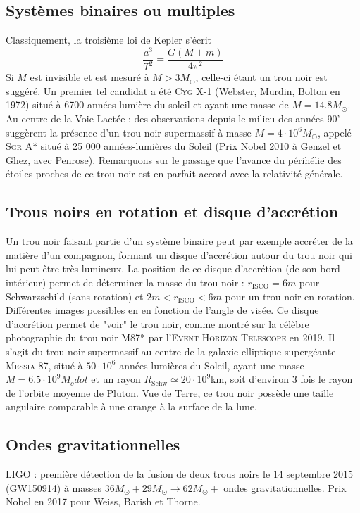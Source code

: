 \subsection{Systèmes binaires ou multiples}
Classiquement, la troisième loi de Kepler s'écrit
\begin{equation}
    \frac{a^3}{T^2} = \frac{G (M+m)}{4 \pi^2}
\end{equation}
Si $M$ est invisible et est mesuré à $M > 3M_\odot$, celle-ci étant un trou noir est suggéré. Un premier tel candidat a été \textsc{Cyg X-1} (Webster, Murdin, Bolton en 1972) situé à 6700 années-lumière du soleil et ayant une masse de $M = 14.8 M_\odot$.\\
Au centre de la Voie Lactée : des observations depuis le milieu des années 90' suggèrent la présence d'un trou noir supermassif à masse $M = 4 \cdot 10^6 M_\odot$, appelé \textsc{Sgr A*} situé à 25 000 années-lumières du Soleil (Prix Nobel 2010 à Genzel et Ghez, avec Penrose). Remarquons sur le passage que l'avance du périhélie des étoiles proches de ce trou noir est en parfait accord avec la relativité générale.
\subsection{Trous noirs en rotation et disque d'accrétion}
Un trou noir faisant partie d'un système binaire peut par exemple accréter de la matière d'un compagnon, formant un disque d'accrétion autour du trou noir qui lui peut être très lumineux. La position de ce disque d'accrétion (de son bord intérieur) permet de déterminer la masse du trou noir : $r_\text{ISCO} = 6m$ pour Schwarzschild (sans rotation) et $2m<r_\text{ISCO}<6m$ pour un trou noir en rotation. \\
Différentes images possibles en en fonction de l'angle de visée. Ce disque d'accrétion permet de "voir" le trou noir, comme montré sur la célèbre photographie du trou noir \textsc{M87*} par l'\textsc{Event Horizon Telescope} en 2019. Il s'agit du trou noir supermassif au centre de la galaxie elliptique supergéante \textsc{Messia 87}, situé à $50 \cdot 10^6$ années lumières du Soleil, ayant une masse $M = 6.5 \cdot 10^9 M_odot$ et un rayon $R_\text{Schw} \simeq 20 \cdot 10^9$km, soit d'environ 3 fois le rayon de l'orbite moyenne de Pluton. Vue de Terre, ce trou noir possède une taille angulaire comparable à une orange à la surface de la lune.
\subsection{Ondes gravitationnelles}
LIGO : première détection de la fusion de deux trous noirs le 14 septembre 2015 (\textsc{GW150914}) à masses $36 M_\odot + 29M_\odot \to 62 M_\odot +$ ondes gravitationnelles. Prix Nobel en 2017 pour Weiss, Barish et Thorne.
